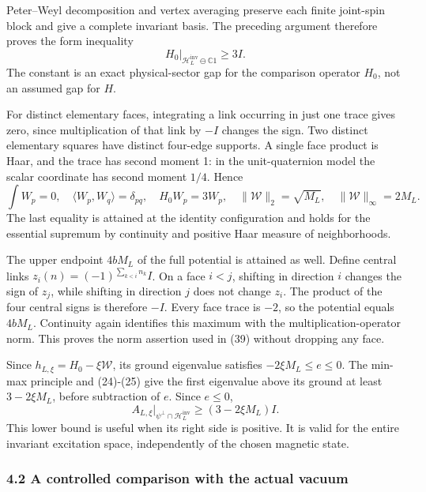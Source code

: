 \documentclass[
  11pt,
]{article}
\begin{document}
Peter--Weyl decomposition and vertex averaging preserve each finite
joint-spin block and give a complete invariant basis. The preceding
argument therefore proves the form inequality \[
 H_0\big|_{\mathcal H_L^{\mathrm{inv}}\ominus\mathbb C1}\ge3I.
\tag{24}
\] The constant is an exact physical-sector gap for the comparison
operator \(H_0\), not an assumed gap for \(H\).

For distinct elementary faces, integrating a link occurring in just one
trace gives zero, since multiplication of that link by \(-I\) changes
the sign. Two distinct elementary squares have distinct four-edge
supports. A single face product is Haar, and the trace has second moment
1: in the unit-quaternion model the scalar coordinate has second moment
\(1/4\). Hence \[
 \int W_p=0,\quad\langle W_p,W_q\rangle=\delta_{pq},
 \quad H_0W_p=3W_p,\quad\|\mathcal W\|_2=\sqrt{M_L},
 \quad\|\mathcal W\|_\infty=2M_L.
\tag{25}
\] The last equality is attained at the identity configuration and holds
for the essential supremum by continuity and positive Haar measure of
neighborhoods.

The upper endpoint \(4bM_L\) of the full potential is attained as well.
Define central links \(z_i(n)=(-1)^{\sum_{k<i}n_k}I\). On a face
\(i<j\), shifting in direction \(i\) changes the sign of \(z_j\), while
shifting in direction \(j\) does not change \(z_i\). The product of the
four central signs is therefore \(-I\). Every face trace is \(-2\), so
the potential equals \(4bM_L\). Continuity again identifies this maximum
with the multiplication-operator norm. This proves the norm assertion
used in (39) without dropping any face.

Since \(h_{L,\xi}=H_0-\xi\mathcal W\), its ground eigenvalue satisfies
\(-2\xi M_L\le e\le0\). The min-max principle and (24)-(25) give the
first eigenvalue above its ground at least \(3-2\xi M_L\), before
subtraction of \(e\). Since \(e\le0\), \[
 \boxed{\quad A_{L,\xi}\big|_{\psi^\perp\cap\mathcal H_L^{\mathrm{inv}}}
 \ge(3-2\xi M_L)I.\quad}
\tag{26}
\] This lower bound is useful when its right side is positive. It is
valid for the entire invariant excitation space, independently of the
chosen magnetic state.

\subsubsection{4.2 A controlled comparison with the actual
vacuum}\label{a-controlled-comparison-with-the-actual-vacuum}
\end{document}
